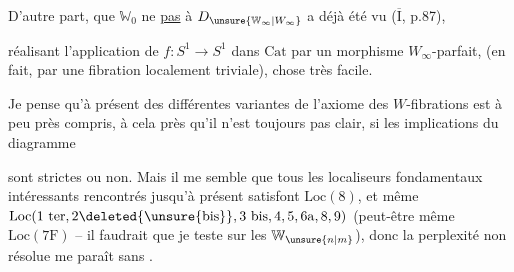 \unsure{/|,} D'autre part, que $\mathbb W_0$ ne  \uline{pas} à $D_{\unsure{\mathbb W_\infty|W_\infty}}$  a déjà été vu ($\overline{\mathrm I}$, p.87),

réalisant l'application de  $f:S^1\longrightarrow S^1$ dans $\mathrm{Cat}$ par un morphisme $W_\infty$-parfait, (en fait, par une  fibration localement triviale), chose très facile.


Je pense qu'à présent  des différentes variantes de l'axiome des $W$-fibrations est à peu près compris, à cela près qu'il n'est toujours pas clair,  si les implications du diagramme

sont strictes ou non. Mais il me semble que tous les localiseurs fondamentaux intéressants rencontrés jusqu'à présent satisfont $\mathrm{Loc}(8)$, et même $\mathrm{Loc}(1\ \mathrm{ter},2\deleted{\unsure{\mathrm{bis}}},3\ \mathrm{bis},4,5,6\mathrm a,8,9)$ (peut-être même $\mathrm{Loc}(7\mathrm F)$ -- il  faudrait que je teste sur les $\mathbb W_{\unsure{n|m}}$), donc la perplexité non résolue me paraît sans .

